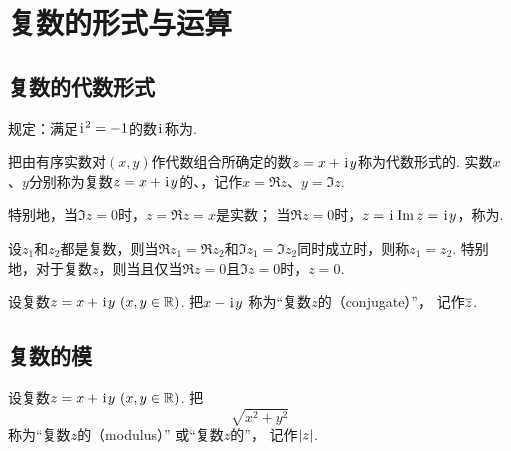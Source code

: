\section{复数的形式与运算}
\subsection{复数的代数形式}
\begin{definition}%
规定：满足\(\kern1pt\mathrm{i}\kern1pt^2=-1\)的数\(\kern1pt\mathrm{i}\kern1pt\)称为.
\end{definition}

\begin{definition}
把由有序实数对\((x,y)\)作代数组合所确定的数\(z = x + \kern1pt\mathrm{i}\kern1pt y\)称为代数形式的.
实数\(x\)、\(y\)分别称为复数\(z = x + \kern1pt\mathrm{i}\kern1pt y\)的、，记作\(x=\Re z\)、\(y=\Im z\).

特别地，当\(\Im z = 0\)时，\(z=\Re z = x\)是实数；
当\(\Re z = 0\)时，\(z = \kern1pt\mathrm{i}\kern1pt \Im z = \kern1pt\mathrm{i}\kern1pt y\)，称为.
\end{definition}

\begin{definition}%
设\(z_1\)和\(z_2\)都是复数，则当\(\Re z_1 = \Re z_2\)和\(\Im z_1 = \Im z_2\)同时成立时，则称\(z_1 = z_2\).
特别地，对于复数\(z\)，则当且仅当\(\Re z = 0\)且\(\Im z = 0\)时，\(z = 0\).
\end{definition}

\begin{definition}%
设复数\(z = x + \kern1pt\mathrm{i}\kern1pt y\ (x,y \in \mathbb{R})\).
把\(x - \kern1pt\mathrm{i}\kern1pt y\)
称为“复数\(z\)的（conjugate）”，
记作\(\overline{z}\).
\end{definition}

\subsection{复数的模}
\begin{definition}%
设复数\(z = x + \kern1pt\mathrm{i}\kern1pt y\ (x,y \in \mathbb{R})\).
把\begin{equation*}
	\sqrt{x^2 + y^2}
\end{equation*}
称为“复数\(z\)的（modulus）”
或“复数\(z\)的”，
记作\(\abs{z}\).
\end{definition}

